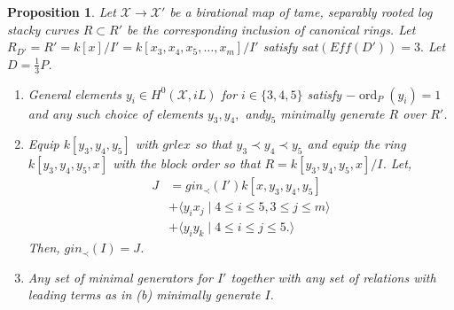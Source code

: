 \documentclass{amsart}
\theoremstyle{plain}
\newtheorem{prop}[thm]{Proposition}
\theoremstyle{definition}
\theoremstyle{remark}
\numberwithin{equation}{section}
\newcommand \sx{\mathscr X}
\DeclareMathOperator{\ord}{ord}
\begin{document}
\begin{prop}
\label{prop:sat_three_induction}
Let $\sx \rightarrow \sx'$ be a birational map of tame, separably
rooted  log stacky curves $R \subset R'$ be the corresponding
inclusion of canonical rings. Let $R_{D'} = R' = k[x]/I'= k[x_3, x_4
, x_5,\ldots, x_m]/I'$ satisfy $sat(Eff(D')) = 3.$ Let $D = \frac{1}{
3}P$.

\begin{enumerate}
	\item[(a)] General elements  $y_i \in H^0(\sx,iL)$ for $i \in \{3,
		4,5\}$ satisfy $-\ord_P(y_i) = 1$ and any such choice of elements $y
		_3,y_4,$ and$ y_5$ minimally generate $R$ over $R'$.
	\item[(b)] Equip $k[y_3,y_4,y_5]$ with $grlex$ so that $y_3 \prec 
		y_4 \prec y_5$ 
		and equip the ring $k[y_3,y_4,y_5,x]$ with the block 
		order so that $R = k[y_3,y_4,y_5,x]/I$. Let,
		\begin{align*}
			J &= gin_\prec(I')k[x,y_3,y_4,y_5] \\
			&+\langle y_i x_j \mid 4 \leq i \leq 5, 3 \leq j \leq m\rangle \\
			&+\langle y_iy_k \mid 4 \leq i \leq j \leq 5.\rangle 
		\end{align*}
			Then, $gin_\prec(I) = J$.
	\item[(c)] Any set of minimal generators for $I'$ together with 
		any set of relations with leading terms as in (b) minimally 
		generate $I$.
\end{enumerate}
\end{prop}
\end{document}

